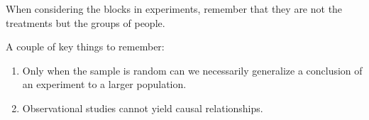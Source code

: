 When considering the blocks in experiments, remember that they are not the
treatments but the groups of people.

A couple of key things to remember:
\begin{enumerate}
    \item Only when the sample is random can we necessarily generalize a conclusion of an experiment to a larger population.
    \item Observational studies cannot yield causal relationships.
\end{enumerate}
